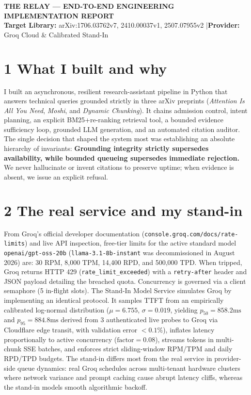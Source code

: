 \documentclass[9pt]{article}
\begin{document}
\begin{center}
    {\fontsize{11}{13}\selectfont \textbf{\color{primary}THE RELAY --- END-TO-END ENGINEERING IMPLEMENTATION REPORT}}\\[1.5pt]
    {\fontsize{7}{8.2}\selectfont \textbf{Target Library:} arXiv:1706.03762v7, 2410.00037v1, 2507.07955v2 \quad|\quad \textbf{Provider:} Groq Cloud \& Calibrated Stand-In}
\end{center}
\vspace{-6pt}

\section{1 \quad What I built and why}
I built an asynchronous, resilient research-assistant pipeline in Python that answers technical queries grounded strictly in three arXiv preprints (\textit{Attention Is All You Need}, \textit{Moshi}, and \textit{Dynamic Chunking}). It chains admission control, intent planning, an explicit BM25+re-ranking retrieval tool, a bounded evidence sufficiency loop, grounded LLM generation, and an automated citation auditor.
The single decision that shaped the system most was establishing an absolute hierarchy of invariants: \textbf{Grounding integrity strictly supersedes availability, while bounded queueing supersedes immediate rejection.} We never hallucinate or invent citations to preserve uptime; when evidence is absent, we issue an explicit refusal.

\section{2 \quad The real service and my stand-in}
From Groq's official developer documentation (\texttt{console.groq.com/docs/rate-limits}) and live API inspection, free-tier limits for the active standard model \texttt{openai/gpt-oss-20b} (\texttt{llama-3.1-8b-instant} was decommissioned in August 2026) are: 30 RPM, 8,000 TPM, 14,400 RPD, and 500,000 TPD. When tripped, Groq returns HTTP 429 (\texttt{rate\_limit\_exceeded}) with a \texttt{retry-after} header and JSON payload detailing the breached quota. Concurrency is governed via a client semaphore (5 in-flight slots).
The Stand-In Model Service simulates Groq by implementing an identical protocol. It samples TTFT from an empirically calibrated log-normal distribution ($\mu = 6.755$, $\sigma = 0.019$, yielding $p_{50} = 858.2\text{ms}$ and $p_{95} = 884.8\text{ms}$ derived from 3 authenticated live probes to Groq via Cloudflare edge transit, with validation error $<0.1\%$), inflates latency proportionally to active concurrency ($\text{factor} = 0.08$), streams tokens in multi-chunk SSE batches, and enforces strict sliding-window RPM/TPM and daily RPD/TPD budgets. The stand-in differs most from the real service in provider-side queue dynamics: real Groq schedules across multi-tenant hardware clusters where network variance and prompt caching cause abrupt latency cliffs, whereas the stand-in models smooth algorithmic backoff.
\end{document}
